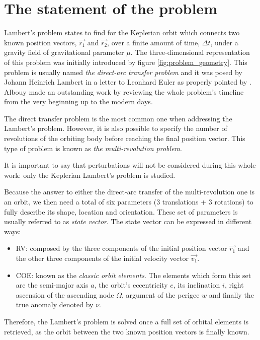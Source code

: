 \section{The statement of the problem}
\label{sec:statement}

Lambert's problem states to find for the Keplerian orbit which connects two
known position vectors, $\vec{r_{1}}$ and $\vec{r_{2}}$, over a finite amount of
time, $\Delta t$, under a gravity field of gravitational parameter $\mu$. The
three-dimensional representation of this problem was initially introduced by
figure \ref{fig:problem_geometry}. This problem is usually named \textit{the
  direct-arc transfer problem} and it was posed by Johann Heinrich Lambert in a
letter to Leonhard Euler as properly pointed by \cite{albouy2019}. Albouy made
an outstanding work by reviewing the whole problem's timeline from the very
beginning up to the modern days.

The direct transfer problem is the most common one when addressing the Lambert's
problem. However, it is also possible to specify the number of revolutions of
the orbiting body before reaching the final position vector. This type of
problem is known as \textit{the multi-revolution problem}.

It is important to say that perturbations will not be considered during this
whole work: only the Keplerian Lambert's problem is studied.

Because the answer to either the direct-arc transfer of the multi-revolution one
is an orbit, we then need a total of six parameters (3 translations + 3
rotations) to fully describe its shape, location and orientation. These set of
parameters is usually referred to as \textit{state vector}. The state vector can
be expressed in different ways:

\begin{itemize}
  \item RV: composed by the three components of the initial position
        vector $\vec{r_{1}}$ and the other three components of the
        initial velocity vector $\vec{v_{1}}$.
  \item COE: known as the \textit{classic orbit elements}. The
        elements which form this set are the semi-major axis $a$, the
        orbit's eccentricity $e$, its inclination $i$, right ascension
        of the ascending node $\Omega$, argument of the perigee $w$ and
        finally the true anomaly denoted by $\nu$.
\end{itemize}

Therefore, the Lambert's problem is solved once a full set of orbital elements
is retrieved, as the orbit between the two known position vectors is finally
known.
